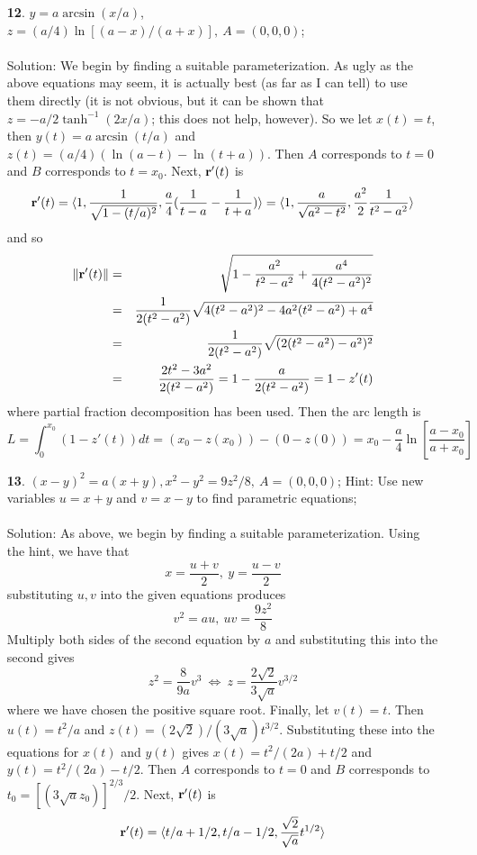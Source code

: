 \documentclass[12pt]{amsbook}
\newcommand{\la}{\langle}
\newcommand{\ra}{\rangle}
\begin{document}
\begin{enumerate}
  \item[{\small\bf 12}.] $y= a\arcsin(x/a)$, $z=(a/4)\ln[(a-x)/(a+x)], \ A=(0,0,0)$;
  \\
  \\
  {\sc Solution}: We begin by finding a suitable parameterization. As ugly as the above equations may seem, it is actually best (as far as I can tell) to use them directly (it is not obvious, but it can be shown that $z=-a/2\tanh^{-1}(2x/a)$; this does not help, however). So we let $x(t)=t$, then $y(t)=a\arcsin(t/a)$ and $z(t)=(a/4)(\ln(a-t)-\ln(t+a))$. Then $A$ corresponds to $t=0$ and $B$ corresponds to $t=x_0$. Next, ${\bf r}'(t)$ is
  $${\bf r}'(t)=\la 1,  \frac{1}{\sqrt{1-(t/a)^2}}, \frac{a}{4}(\frac{1}{t-a}-\frac{1}{t+a})\ra = \la 1, \frac{a}{\sqrt{a^2-t^2}}, \frac{a^2}{2}\frac{1}{t^2-a^2}\ra$$
  and so 
  \begin{eqnarray*}
  \|{\bf r}'(t)\|&=& \sqrt{1-\frac{a^2}{t^2-a^2}+\frac{a^4}{4(t^2-a^2)^2}}\\
  &=&\frac{1}{2(t^2-a^2)}\sqrt{4(t^2-a^2)^2-4a^2(t^2-a^2)+a^4}\\
  &=&\frac{1}{2(t^2-a^2)}\sqrt{(2(t^2-a^2)-a^2)^2}\\
  &=&\frac{2t^2-3a^2}{2(t^2-a^2)}=1-\frac{a}{2(t^2-a^2)}=1-z'(t)
  \end{eqnarray*}
  where partial fraction decomposition has been used.
  Then the arc length is
  $$L=\int_0^{x_0}(1-z'(t))dt=(x_0-z(x_0))-(0-z(0))=x_0-\frac{a}{4}\ln[\frac{a-x_0}{a+x_0}]$$
  \item[{\small\bf 13}.] $(x-y)^2=a(x+y), x^2-y^2=9z^2/8, \ A=(0,0,0)$; Hint: Use
new variables $u = x+y$ and $v = x-y$ to find parametric equations;
\\
  \\
  {\sc Solution}: As above, we begin by finding a suitable parameterization. Using the hint, we have that
  $$x=\frac{u+v}{2}, \ y=\frac{u-v}{2}$$
substituting $u,v$ into the given equations produces
$$v^2=au, \ uv=\frac{9z^2}{8}$$
 Multiply both sides of the second equation by $a$ and substituting this into the second gives 
$$z^2=\frac{8}{9a}v^3 \ \Leftrightarrow \ z=\frac{2\sqrt{2}}{3\sqrt{a}}v^{3/2}$$
where we have chosen the positive square root. Finally, let $v(t)=t$. Then $u(t)=t^2/a$ and $z(t)=(2\sqrt{2})/(3\sqrt{a})t^{3/2}$. Substituting these into the equations for $x(t)$ and $y(t)$ gives $x(t)=t^2/(2a)+t/2$ and $y(t)=t^2/(2a)-t/2$. Then $A$ corresponds to $t=0$ and $B$ corresponds to $t_0=[(3\sqrt{a}z_0)]^{2/3}/2$. Next, ${\bf r}'(t)$ is
  $${\bf r}'(t)=\la t/a+1/2, t/a-1/2, \frac{\sqrt{2}}{\sqrt{a}}t^{1/2}\ra $$

\end{enumerate}
\end{document}
